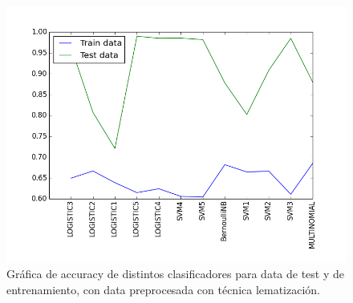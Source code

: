 \documentclass[letter, 10pt]{article}
\begin{document}
\begin{figure}[h]
\begin{center}
\includegraphics[width=1\textwidth]{Images/figure_pregunta2_2.png}
\caption{Gráfica de accuracy de distintos clasificadores para data de test y de entrenamiento, con data preprocesada con técnica lematización.}
\label{G1.1}
\end{center}
\end{figure}
\end{document}
